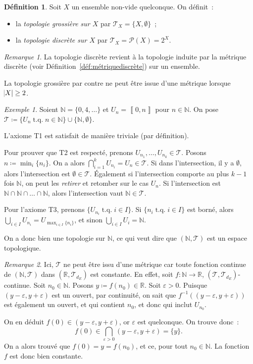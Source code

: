 \documentclass{report}
\theoremstyle{definition}
\newtheorem{déf}[thm]{Définition}
\theoremstyle{remark}
\newtheorem*{rmq}{Remarque}
\newtheorem{ex}{Exemple}[chapter]
\DeclareMathOperator{\tq}{\text{ t.q. }}
\newcommand{\intint}[2]{\left\llbracket#1, #2\right\rrbracket}
\newcommand{\R}{\mathbb R}
\newcommand{\N}{\mathbb N}
\renewcommand{\top}{\mathcal T}
\begin{document}
		\begin{déf} Soit $X$ un ensemble non-vide quelconque. On définit~:
		\begin{itemize}
			\item la \textit{topologie grossière sur $X$} par $\top_X = \{X, \emptyset\}$~;
			\item la \textit{topologie discrète sur $X$} par $\top_X = \mathcal P(X) = 2^X$.
		\end{itemize}
		\end{déf}

		\begin{rmq} La topologie discrète revient à la topologie induite par la métrique discrète (voir Définition~\ref{déf:métriquediscrète}) sur un ensemble.

		La topologie grossière par contre ne peut être issue d'une métrique lorsque $\abs X \geq 2$.
		\end{rmq}

		\begin{ex} Soient $\N = \{0, 4, \ldots\}$ et $U_n = \intint 0n$ pour $n \in \N$. On pose $\top \coloneqq \{U_n \tq n \in \N\} \cup \{\N, \emptyset\}$.

		L'axiome T1 est satisfait de manière triviale (par définition).

		Pour prouver que T2 est respecté, prenons $U_{n_1}, \ldots, U_{n_k} \in \top$. Posons $n \coloneqq \min_i\{n_i\}$. On a alors
		$\bigcap_{i=1}^kU_{n_i} = U_n \in \top$. Si dans l'intersection, il y a $\emptyset$, alors l'intersection est $\emptyset \in \top$. Également si
		l'intersection comporte au plus $k-1$ fois $\N$, on peut les \textit{retirer} et retomber sur le cas $U_n$. Si l'intersection est
		$\N \cap \N \cap \ldots \cap \N$, alors l'intersection vaut $\N \in \top$.

		Pour l'axiome T3, prenons $\{U_{n_i} \tq i \in I\}$. Si $\{n_i \tq i \in I\}$ est borné, alors $\bigcup_{i \in I}U_{n_i} = U_{\max_{i \in I}\{n_i\}}$,
		et sinon $\bigcup_{i \in I}U_i = \N$.

		On a donc bien une topologie sur $\N$, ce qui veut dire que $(\N, \top)$ est un espace topologique.
		\end{ex}

		\begin{rmq} Ici, $\top$ ne peut être issu d'une métrique car toute fonction continue de $(\N, \top)$ dans $(\R, \top_{d_E})$ est constante. En effet,
		soit $f : \N \to \R$, $(\top, \top_{d_E})$-continue. Soit $n_0 \in \N$. Posons $y \coloneqq f(n_0) \in \R$. Soit $\varepsilon > 0$. Puisque
		$(y-\varepsilon, y+\varepsilon)$ est un ouvert, par continuité, on sait que $f^{-1}\left((y-\varepsilon, y+\varepsilon)\right)$ est également un ouvert,
		et qui contient $n_0$, et donc qui inclut $U_{n_0}$.

		On en déduit $f(0) \in (y-\varepsilon, y+\varepsilon)$, or $\varepsilon$ est quelconque. On trouve donc~:
		\[f(0) \in \bigcap_{\varepsilon > 0}(y-\varepsilon, y+\varepsilon) = \{y\}.\]
		On a alors trouvé que $f(0) = y = f(n_0)$, et ce, pour tout $n_0 \in \N$. La fonction $f$ est donc bien constante.
		\end{rmq}
\end{document}
